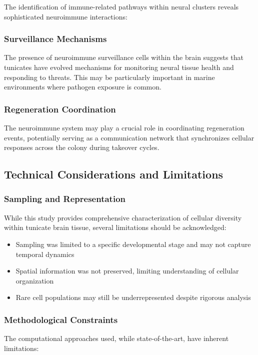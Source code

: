 \documentclass[12pt,a4paper]{article}
\begin{document}
The identification of immune-related pathways within neural clusters reveals sophisticated neuroimmune interactions:

\subsubsection{Surveillance Mechanisms}
The presence of neuroimmune surveillance cells within the brain suggests that tunicates have evolved mechanisms for monitoring neural tissue health and responding to threats. This may be particularly important in marine environments where pathogen exposure is common.

\subsubsection{Regeneration Coordination}
The neuroimmune system may play a crucial role in coordinating regeneration events, potentially serving as a communication network that synchronizes cellular responses across the colony during takeover cycles.

\subsection{Technical Considerations and Limitations}

\subsubsection{Sampling and Representation}
While this study provides comprehensive characterization of cellular diversity within tunicate brain tissue, several limitations should be acknowledged:

\begin{itemize}
\item Sampling was limited to a specific developmental stage and may not capture temporal dynamics
\item Spatial information was not preserved, limiting understanding of cellular organization
\item Rare cell populations may still be underrepresented despite rigorous analysis
\end{itemize}

\subsubsection{Methodological Constraints}
The computational approaches used, while state-of-the-art, have inherent limitations:
\end{document}
